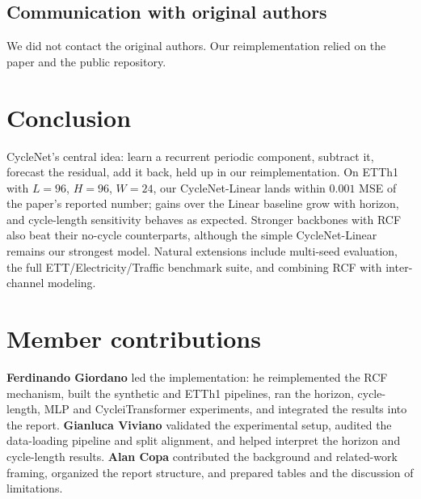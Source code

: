\documentclass[10pt]{article}
\begin{document}
\subsection{Communication with original authors}
We did not contact the original authors. Our reimplementation relied on the paper and the public repository.

\section{Conclusion}

CycleNet's central idea: learn a recurrent periodic component, subtract it, forecast the residual, add it back, held up in our reimplementation. On ETTh1 with $L{=}96$, $H{=}96$, $W{=}24$, our CycleNet-Linear lands within $0.001$ MSE of the paper's reported number; gains over the Linear baseline grow with horizon, and cycle-length sensitivity behaves as expected. Stronger backbones with RCF also beat their no-cycle counterparts, although the simple CycleNet-Linear remains our strongest model. Natural extensions include multi-seed evaluation, the full ETT/Electricity/Traffic benchmark suite, and combining RCF with inter-channel modeling.

\section*{Member contributions}

\textbf{Ferdinando Giordano} led the implementation: he reimplemented the RCF mechanism, built the synthetic and ETTh1 pipelines, ran the horizon, cycle-length, MLP and CycleiTransformer experiments, and integrated the results into the report. \textbf{Gianluca Viviano} validated the experimental setup, audited the data-loading pipeline and split alignment, and helped interpret the horizon and cycle-length results. \textbf{Alan Copa} contributed the background and related-work framing, organized the report structure, and prepared tables and the discussion of limitations.



\end{document}
